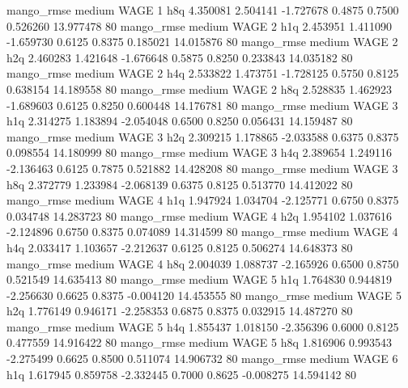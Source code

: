        mango_rmse     medium     WAGE                 1                  h8q  4.350081 2.504141 -1.727678 0.4875 0.7500  0.526260   13.977478 80
       mango_rmse     medium     WAGE                 2                  h1q  2.453951 1.411090 -1.659730 0.6125 0.8375  0.185021   14.015876 80
       mango_rmse     medium     WAGE                 2                  h2q  2.460283 1.421648 -1.676648 0.5875 0.8250  0.233843   14.035182 80
       mango_rmse     medium     WAGE                 2                  h4q  2.533822 1.473751 -1.728125 0.5750 0.8125  0.638154   14.189558 80
       mango_rmse     medium     WAGE                 2                  h8q  2.528835 1.462923 -1.689603 0.6125 0.8250  0.600448   14.176781 80
       mango_rmse     medium     WAGE                 3                  h1q  2.314275 1.183894 -2.054048 0.6500 0.8250  0.056431   14.159487 80
       mango_rmse     medium     WAGE                 3                  h2q  2.309215 1.178865 -2.033588 0.6375 0.8375  0.098554   14.180999 80
       mango_rmse     medium     WAGE                 3                  h4q  2.389654 1.249116 -2.136463 0.6125 0.7875  0.521882   14.428208 80
       mango_rmse     medium     WAGE                 3                  h8q  2.372779 1.233984 -2.068139 0.6375 0.8125  0.513770   14.412022 80
       mango_rmse     medium     WAGE                 4                  h1q  1.947924 1.034704 -2.125771 0.6750 0.8375  0.034748   14.283723 80
       mango_rmse     medium     WAGE                 4                  h2q  1.954102 1.037616 -2.124896 0.6750 0.8375  0.074089   14.314599 80
       mango_rmse     medium     WAGE                 4                  h4q  2.033417 1.103657 -2.212637 0.6125 0.8125  0.506274   14.648373 80
       mango_rmse     medium     WAGE                 4                  h8q  2.004039 1.088737 -2.165926 0.6500 0.8750  0.521549   14.635413 80
       mango_rmse     medium     WAGE                 5                  h1q  1.764830 0.944819 -2.256630 0.6625 0.8375 -0.004120   14.453555 80
       mango_rmse     medium     WAGE                 5                  h2q  1.776149 0.946171 -2.258353 0.6875 0.8375  0.032915   14.487270 80
       mango_rmse     medium     WAGE                 5                  h4q  1.855437 1.018150 -2.356396 0.6000 0.8125  0.477559   14.916422 80
       mango_rmse     medium     WAGE                 5                  h8q  1.816906 0.993543 -2.275499 0.6625 0.8500  0.511074   14.906732 80
       mango_rmse     medium     WAGE                 6                  h1q  1.617945 0.859758 -2.332445 0.7000 0.8625 -0.008275   14.594142 80

